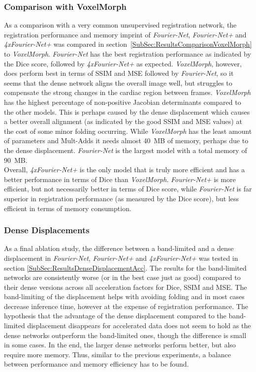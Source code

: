 \subsubsection{Comparison with VoxelMorph} \label{SubSubSec:DiscussionComparisonVoxelMorph}
As a comparison with a very common unsupervised registration network, the registration performance and memory imprint of \emph{Fourier-Net}, \emph{Fourier-Net+} and \emph{4xFourier-Net+} was compared in section~\ref{SubSec:ResultsComparisonVoxelMorph} to \emph{VoxelMorph}. \emph{Fourier-Net} has the best registration performance as indicated by the Dice score, followed by \emph{4xFourier-Net+} as expected. \emph{VoxelMorph}, however, does perform best in terms of SSIM and MSE followed by \emph{Fourier-Net}, so it seems that the dense network aligns the overall image well, but struggles to compensate the strong changes in the cardiac region between frames. \emph{VoxelMorph} has the highest percentage of non-positive Jacobian determinants compared to the other models. This is perhaps caused by the dense displacement which causes a better overall alignment (as indicated by the good SSIM and MSE values) at the cost of some minor folding occurring. While \emph{VoxelMorph} has the least amount of parameters and Mult-Adds it needs almost 40~MB of memory, perhaps due to the dense displacement. \emph{Fourier-Net} is the largest model with a total memory of 90~MB. \\
Overall, \emph{4xFourier-Net+} is the only model that is truly more efficient and has a better performance in terms of Dice than \emph{VoxelMorph}. \emph{Fourier-Net+} is more efficient, but not necessarily better in terms of Dice score, while \emph{Fourier-Net} is far superior in registration performance (as measured by the Dice score), but less efficient in terms of memory consumption.

\subsubsection{Dense Displacements} \label{SubSubSec:DiscussionDenseDisplacements}
As a final ablation study, the difference between a band-limited and a dense displacement in \emph{Fourier-Net}, \emph{Fourier-Net+} and \emph{4xFourier-Net+} was tested in section \ref{SubSec:ResultsDenseDisplacementAcc}. The results for the band-limited networks are consistently worse (or in the best case just as good) compared to their dense versions across all acceleration factors for Dice, SSIM and MSE. The band-limiting of the displacement helps with avoiding folding and in most cases decrease inference time, however at the expense of registration performance. The hypothesis that the advantage of the dense displacement compared to the band-limited displacement disappears for accelerated data does not seem to hold as the dense networks outperform the band-limited ones, though the difference is small in some cases. In the end, the larger dense networks perform better, but also require more memory. Thus, similar to the previous experiments, a balance between performance and memory efficiency has to be found.

